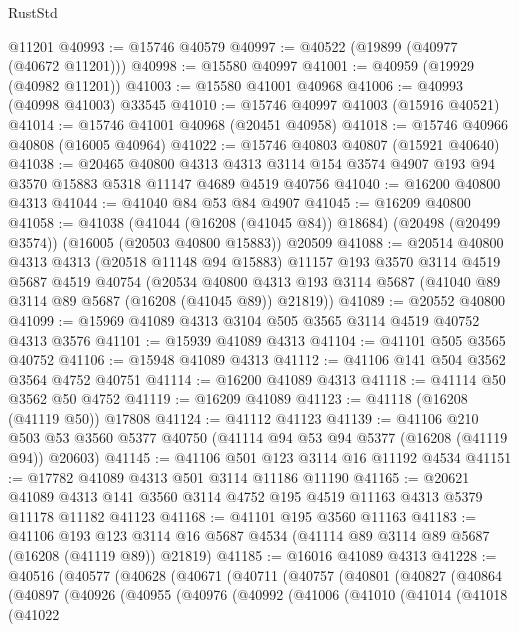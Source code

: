\begin{lexlean}{RustStd}
\begin{coremodule}
    @11201
@40993 := @15746 @40579
@40997 := @40522 (@19899 (@40977 (@40672 @11201)))
@40998 := @15580 @40997
@41001 := @40959 (@19929 (@40982 @11201))
@41003 := @15580 @41001 @40968
@41006 := @40993 (@40998 @41003) @33545
@41010 := @15746 @40997 @41003 (@15916 @40521)
@41014 := @15746 @41001 @40968 (@20451 @40958)
@41018 := @15746 @40966 @40808 (@16005 @40964)
@41022 := @15746 @40803 @40807 (@15921 @40640)
@41038 := @20465
    @40800
    @4313
    @4313
    @3114
    @154
    @3574
    @4907
    @193
    @94
    @3570
    @15883
    @5318
    @11147
    @4689
    @4519
    @40756
@41040 := @16200 @40800 @4313
@41044 := @41040 @84 @53 @84 @4907
@41045 := @16209 @40800
@41058 := @41038
    (@41044 (@16208 (@41045 @84)) @18684)
    (@20498 (@20499 @3574))
    (@16005 (@20503 @40800 @15883))
    @20509
@41088 := @20514
    @40800
    @4313
    @4313
    (@20518 @11148 @94 @15883)
    @11157
    @193
    @3570
    @3114
    @4519
    @5687
    @4519
    @40754
    (@20534 @40800 @4313 @193 @3114 @5687 (@41040 @89 @3114 @89 @5687 (@16208 (@41045 @89)) @21819))
@41089 := @20552 @40800
@41099 := @15969 @41089 @4313 @3104 @505 @3565 @3114 @4519 @40752 @4313 @3576
@41101 := @15939 @41089 @4313
@41104 := @41101 @505 @3565 @40752
@41106 := @15948 @41089 @4313
@41112 := @41106 @141 @504 @3562 @3564 @4752 @40751
@41114 := @16200 @41089 @4313
@41118 := @41114 @50 @3562 @50 @4752
@41119 := @16209 @41089
@41123 := @41118 (@16208 (@41119 @50)) @17808
@41124 := @41112 @41123
@41139 := @41106
    @210
    @503
    @53
    @3560
    @5377
    @40750
    (@41114 @94 @53 @94 @5377 (@16208 (@41119 @94)) @20603)
@41145 := @41106 @501 @123 @3114 @16 @11192 @4534
@41151 := @17782 @41089 @4313 @501 @3114 @11186 @11190
@41165 := @20621
    @41089
    @4313
    @141
    @3560
    @3114
    @4752
    @195
    @4519
    @11163
    @4313
    @5379
    @11178
    @11182
    @41123
@41168 := @41101 @195 @3560 @11163
@41183 := @41106
    @193
    @123
    @3114
    @16
    @5687
    @4534
    (@41114 @89 @3114 @89 @5687 (@16208 (@41119 @89)) @21819)
@41185 := @16016 @41089 @4313
@41228 := @40516
    (@40577
      (@40628
        (@40671
          (@40711
            (@40757
              (@40801
                (@40827
                  (@40864
                    (@40897
                      (@40926
                        (@40955
                          (@40976
                            (@40992
                              (@41006
                                (@41010
                                  (@41014
                                    (@41018
                                      (@41022

\end{coremodule}
\end{lexlean}
